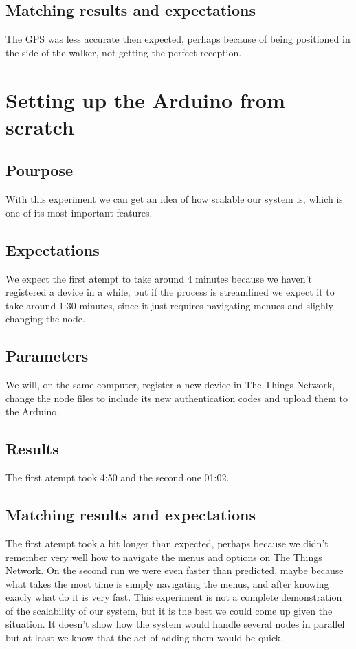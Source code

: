 	\subsection*{Matching results and expectations}
		The GPS was less accurate then expected, perhaps because of being positioned in the side of the walker, not getting the perfect reception.

\section{Setting up the Arduino from scratch}

	\subsection*{Pourpose}
		With this experiment we can get an idea of how scalable our system is, which is one of its most important features.
	\subsection*{Expectations}
		We expect the first atempt to take around 4 minutes because we haven't registered a device in a while, but if the process is streamlined we expect it to take around 1:30 minutes, since it just requires navigating menues and slighly changing the node.
	\subsection*{Parameters}
		We will, on the same computer, register a new device in The Things Network, change the node files to include its new authentication codes and upload them to the Arduino.
	\subsection*{Results}
		The first atempt took 4:50 and the second one 01:02.
	\subsection*{Matching results and expectations}
		The first atempt took a bit longer than expected, perhaps because we didn't remember very well how to navigate the menus and options on The Things Network. On the second run we were even faster than predicted, maybe because what takes the most time is simply navigating the menus, and after knowing exacly what do it is very fast. This experiment is not a complete demonstration of the scalability of our system, but it is the best we could come up given the situation. It doesn't show how the system would handle several nodes in parallel but at least we know that the act of adding them would be quick.

